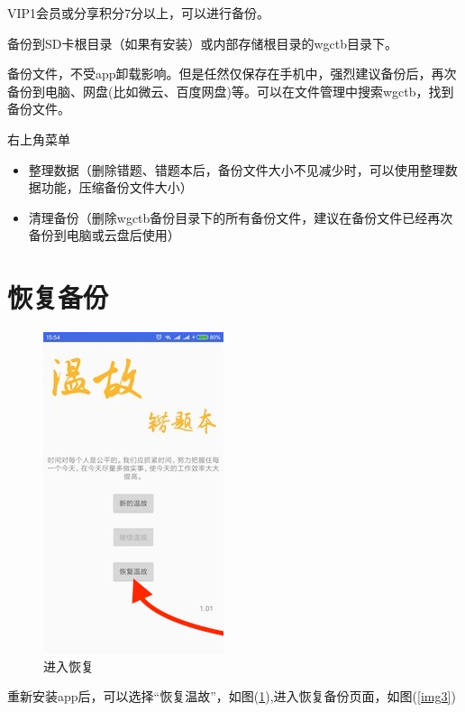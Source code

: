 VIP1会员或分享积分7分以上，可以进行备份。

备份到SD卡根目录（如果有安装）或内部存储根目录的wgctb目录下。

备份文件，不受app卸载影响。但是任然仅保存在手机中，强烈建议备份后，再次备份到电脑、网盘(比如微云、百度网盘)等。可以在文件管理中搜索wgctb，找到备份文件。\newline

右上角菜单
\begin{itemize}
	\item 整理数据（删除错题、错题本后，备份文件大小不见减少时，可以使用整理数据功能，压缩备份文件大小）
	\item 清理备份（删除wgctb备份目录下的所有备份文件，建议在备份文件已经再次备份到电脑或云盘后使用）
\end{itemize}

\section{恢复备份}
\label{restore}
\begin{figure}[H]
	\centering
	\includegraphics{img/2.jpg}
	\caption{进入恢复}
	\label{img2}
\end{figure}

重新安装app后，可以选择“恢复温故”，如图(\ref{img2}),进入恢复备份页面，如图(\ref{img3})

